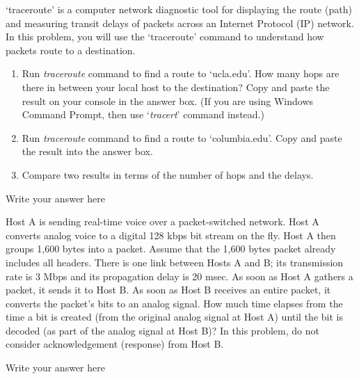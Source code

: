\documentclass{report}
\begin{document}
\mktitle

\begin{problem}
`traceroute' is a computer network diagnostic tool for displaying the route (path) and measuring transit delays of packets across an Internet Protocol (IP) network. In this problem, you will use the `traceroute' command to understand how packets route to a destination.

\begin{enumerate}
\item Run \textit{traceroute} command to find a route to `ucla.edu'. How many hops are there in between your local host to the destination? Copy and paste the result on your console in the answer box. (If you are using Windows Command Prompt, then use `\textit{tracert}' command instead.)
\item Run \textit{traceroute} command to find a route to `columbia.edu'. Copy and paste the result into the answer box.
\item Compare two results in terms of the number of hops and the delays.
\end{enumerate}

    \begin{answer}{30em}
    Write your answer here
    \end{answer}

\end{problem}

\newpage


\begin{problem}
Host A is sending real-time voice over a packet-switched network. Host A converts analog voice to a digital 128 kbps bit stream on the fly. Host A then groups 1,600 bytes into a packet. Assume that the 1,600 bytes packet already includes all headers. There is one link between Hosts A and B; its transmission rate is 3 Mbps and its propagation delay is 20 msec. As soon as Host A gathers a packet, it sends it to Host B. As soon as Host B receives an entire packet, it converts the packet’s bits to an analog signal. How much time elapses from the time a bit is created (from the original analog signal at Host A) until the bit is decoded (as part of the analog signal at Host B)? In this problem, do not consider acknowledgement (response) from Host B.

    \begin{answer}{30em}
    Write your answer here
    \end{answer}

\end{problem}
\end{document}
